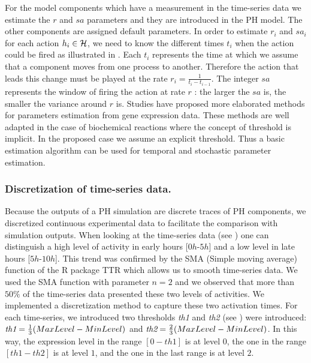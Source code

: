 For the model components which have a measurement in the time-series data we estimate the $r$ and $sa$ parameters and they are introduced in the PH model. 
The other components are 
assigned default parameters. In order to estimate $r_{i}$ and $sa_{i}$ for each action $h_{i} \in \mathcal{H}$, we need to know the different times $t_{i}$  when the action could be fired as illustrated 
in . Each  $t_{i}$ represents the time at which we assume that a component moves from one process to another. Therefore the action that leads this 
change must be played at the rate $r_{i}=\frac{1}{t_{i}-t_{i-1}}$. The integer $sa$ represents the window of firing the action at rate $r$ : the larger the $sa$ is, the smaller the variance around $r$ is. 
Studies \cite{AMSW2012,Batt15092010,RAT2006} have proposed more elaborated methods for parameters estimation from gene expression data. These methods are well adapted in the case of biochemical reactions where 
the concept of threshold is implicit. In the proposed case we assume an explicit threshold. Thus a basic estimation algorithm can be used for temporal and stochastic parameter estimation.

\subsubsection{Discretization of time-series data.}

Because the outputs of a PH simulation are discrete traces of PH components, we discretized continuous experimental data to facilitate 
the comparison with simulation outputs.
When looking at the time-series data (see ) one can distinguish a high level of
activity in early hours [$0h$-$5h$] and a low level in late hours [$5h$-$10h$]. This trend was confirmed by the SMA (Simple moving average) function of the R package TTR which allows us
to smooth time-series data. We used the SMA function with parameter $n=2$ and we observed that more than $50\%$ of the time-series data presented these two levels of activities.
We implemented a discretization method to capture these
two activation times. For each time-series, we introduced two thresholds \emph{th1} and \emph{th2} (see ) were introduced: 
$\emph{th1}=\frac{1}{3}(MaxLevel-MinLevel)$ and $\emph{th2}=\frac{2}{3}(MaxLevel-MinLevel)$. 
In this way, the expression level in the range $[0-th1]$ is at level $0$, the one in the range $[th1-th2]$ is at level $1$, and the one in the last range is at
level $2$. 


